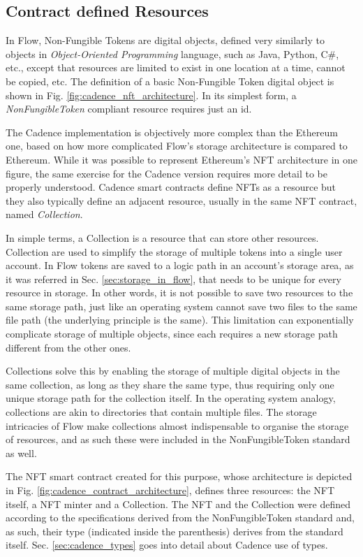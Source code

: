 \documentclass[../main.tex]{subfiles}
\begin{document}
\subsection{Contract defined Resources}
In Flow, Non-Fungible Tokens are digital objects, defined very similarly to objects in \textit{Object-Oriented Programming} language, such as Java, Python, C\#, etc., except that resources are limited to exist in one location at a time, cannot be copied, etc. The definition of a basic Non-Fungible Token digital object is shown in Fig. \ref{fig:cadence_nft_architecture}. In its simplest form, a \textit{NonFungibleToken} compliant resource requires just an id.
\par
The Cadence implementation is objectively more complex than the Ethereum one, based on how more complicated Flow's storage architecture is compared to Ethereum. While it was possible to represent Ethereum's NFT architecture in one figure, the same exercise for the Cadence version requires more detail to be properly understood. Cadence smart contracts define NFTs as a resource but they also typically define an adjacent resource, usually in the same NFT contract, named \textit{Collection}.
\par
In simple terms, a Collection is a resource that can store other resources. Collection are used to simplify the storage of multiple tokens into a single user account. In Flow tokens are saved to a logic path in an account's storage area, as it was referred in Sec. \ref{sec:storage_in_flow}, that needs to be unique for every resource in storage. In other words, it is not possible to save two resources to the same storage path, just like an operating system cannot save two files to the same file path (the underlying principle is the same). This limitation can exponentially complicate storage of multiple objects, since each requires a new storage path different from the other ones.
\par
Collections solve this by enabling the storage of multiple digital objects in the same collection, as long as they share the same type, thus requiring only one unique storage path for the collection itself. In the operating system analogy, collections are akin to directories that contain multiple files. The storage intricacies of Flow make collections almost indispensable to organise the storage of resources, and as such these were included in the NonFungibleToken standard as well.
\par
The NFT smart contract created for this purpose, whose architecture is depicted in Fig. \ref{fig:cadence_contract_architecture}, defines three resources: the NFT itself, a NFT minter and a Collection. The NFT and the Collection were defined according to the specifications derived from the NonFungibleToken standard and, as such, their type (indicated inside the parenthesis) derives from the standard itself. Sec. \ref{sec:cadence_types} goes into detail about Cadence use of types.
\end{document}

